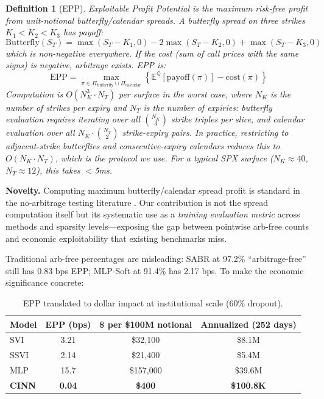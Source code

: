 \documentclass[11pt,a4paper]{article}
\newtheorem{definition}[theorem]{Definition}
\newcommand{\E}{\mathbb{E}}
\begin{document}
\begin{definition}[EPP]
\emph{Exploitable Profit Potential} is the maximum risk-free profit from unit-notional butterfly/calendar spreads. A butterfly spread on three strikes $K_1 < K_2 < K_3$ has payoff:
\begin{equation}
    \text{Butterfly}(S_T) = \max(S_T - K_1, 0) - 2\max(S_T - K_2, 0) + \max(S_T - K_3, 0)
\end{equation}
which is non-negative everywhere. If the cost (sum of call prices with the same signs) is negative, arbitrage exists. EPP is:
\begin{equation}
    \text{EPP} = \max_{\pi \in \Pi_{\text{butterfly}} \cup \Pi_{\text{calendar}}} \left\{ \E^{\mathbb{Q}}[\text{payoff}(\pi)] - \text{cost}(\pi) \right\}
\end{equation}
Computation is $O(N_K^3 \cdot N_T)$ per surface in the worst case, where $N_K$ is the number of strikes per expiry and $N_T$ is the number of expiries: butterfly evaluation requires iterating over all $\binom{N_K}{3}$ strike triples per slice, and calendar evaluation over all $N_K \cdot \binom{N_T}{2}$ strike-expiry pairs. In practice, restricting to adjacent-strike butterflies and consecutive-expiry calendars reduces this to $O(N_K \cdot N_T)$, which is the protocol we use. For a typical SPX surface ($N_K \approx 40$, $N_T \approx 12$), this takes $<$5ms.
\end{definition}

\textbf{Novelty.} Computing maximum butterfly/calendar spread profit is standard in the no-arbitrage testing literature \citep{cousot2007, davis2007}. Our contribution is not the spread computation itself but its systematic use as a \textit{training evaluation metric} across methods and sparsity levels---exposing the gap between pointwise arb-free counts and economic exploitability that existing benchmarks miss.

Traditional arb-free percentages are misleading: SABR at 97.2\% ``arbitrage-free'' still has 0.83 bps EPP; MLP-Soft at 91.4\% has 2.17 bps. To make the economic significance concrete:

\begin{table}[h]
\centering
\caption{EPP translated to dollar impact at institutional scale (60\% dropout).}
\label{tab:epp_dollars}
\begin{tabular}{lccc}
\toprule
\textbf{Model} & \textbf{EPP (bps)} & \textbf{\$ per \$100M notional} & \textbf{Annualized (252 days)} \\
\midrule
SVI & 3.21 & \$32,100 & \$8.1M \\
SSVI & 2.14 & \$21,400 & \$5.4M \\
MLP & 15.7 & \$157,000 & \$39.6M \\
\textbf{CINN} & \textbf{0.04} & \textbf{\$400} & \textbf{\$100.8K} \\
\bottomrule
\end{tabular}
\end{table}
\end{document}
